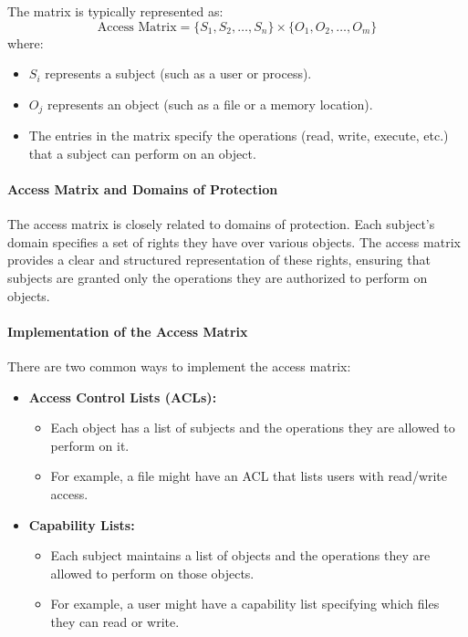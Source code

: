 The matrix is typically represented as:
\[
    \text{Access Matrix} = \{S_1, S_2, \dots, S_n\} \times \{O_1, O_2, \dots, O_m\}
\]
where:
\begin{itemize}
    \item $S_i$ represents a subject (such as a user or process).
    \item $O_j$ represents an object (such as a file or a memory location).
    \item The entries in the matrix specify the operations (read, write, execute, etc.) that a subject can perform on an object.
\end{itemize}

\paragraph{Access Matrix and Domains of Protection}
The access matrix is closely related to domains of protection. Each subject's domain specifies a set of rights they have over various objects. The access matrix provides a clear and structured representation of these rights, ensuring that subjects are granted only the operations they are authorized to perform on objects.

\paragraph{Implementation of the Access Matrix}
There are two common ways to implement the access matrix:

\begin{itemize}
    \item \textbf{Access Control Lists (ACLs):}
    \begin{itemize}
        \item Each object has a list of subjects and the operations they are allowed to perform on it.
        \item For example, a file might have an ACL that lists users with read/write access.
    \end{itemize}
    
    \item \textbf{Capability Lists:}
    \begin{itemize}
        \item Each subject maintains a list of objects and the operations they are allowed to perform on those objects.
        \item For example, a user might have a capability list specifying which files they can read or write.
    \end{itemize}
\end{itemize}